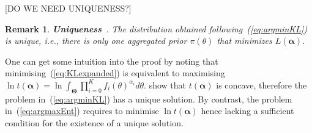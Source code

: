 \documentclass[a4paper, notitlepage, 10pt]{article}
\DeclareMathOperator*{\argmin}{arg\,min}
\newtheorem{remark}{Remark}[]
\begin{document}
[DO WE NEED UNIQUENESS?] %

\begin{remark}
\label{remark:uniqueness}
\textbf{Uniqueness}~\citep{rufo2012A}.
 The distribution obtained following~(\ref{eq:argminKL}) is unique, i.e., there is only one aggregated prior $\pi(\theta)$ that minimizes $L(\boldsymbol\alpha)$.
\end{remark}
One can get some intuition into the proof by noting that minimising~(\ref{eq:KLexpanded}) is equivalent to maximising $\ln t(\boldsymbol\alpha) = \ln\int_{\boldsymbol\Theta}\prod_{i=0}^{K}f_i(\theta)^{\alpha_i}d\theta$. 
\cite{rufo2012A} show that $t(\boldsymbol\alpha)$ is concave, therefore the problem in~(\ref{eq:argminKL}) has a unique solution.
By contrast, the problem in~(\ref{eq:argmaxEnt}) requires to minimise $\ln t(\boldsymbol\alpha)$ hence lacking a sufficient condition for the existence of a unique solution.

% 
% 
% 
% 
\end{document}
